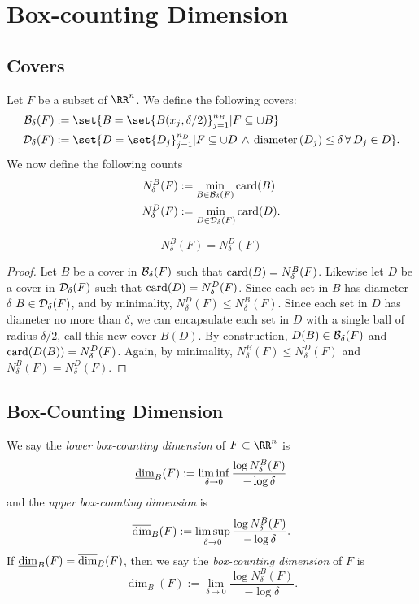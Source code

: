 
\chapter{Box-counting Dimension}

\section{Covers}

Let $F$ be a subset of $\RR^n$.
We define the following covers:
\begin{align*}
	\mcb_\delta(F)&:=\set{B=\set{B(x_j,\delta/2)}_{j=1}^{n_B}| F\subseteq \cup B}\\
	\mcd_\delta(F)&:=\set{D=\set{D_j}_{j=1}^{n_D}| F\subseteq \cup D \,\wedge\,\diam {(D_j)}\leq\delta\, \forall \, D_j\in D}.
\end{align*}
We now define the following counts
\begin{align*}
	N^B_\delta(F)&:=\min\limits_{B\in\mathcal{B}_\delta(F)}\operatorname{card}(B)\\
	N^D_\delta(F)&:=\min\limits_{D\in\mathcal{D}_\delta(F)}\operatorname{card}(D).
\end{align*}

\begin{thm}
	\[
		N^B_\delta(F)=N^D_\delta(F)
	\]
\end{thm}
\begin{proof}
	Let $B$ be a cover in $\mathcal{B}_\delta(F)$ such that $\operatorname{card}(B)=N^B_\delta(F)$.
	Likewise let $D$ be a cover in $\mathcal{D}_\delta(F)$ such that $\operatorname{card}(D)=N^D_\delta(F)$.
	Since each set in $B$ has diameter $\delta$ $B\in\mathcal{D}_\delta(F)$, and by minimality, $N^D_\delta(F)\leq N^B_\delta(F)$.
	Since each set in $D$ has diameter no more than $\delta$, we can encapsulate each set in $D$ with a single ball of radius $\delta/2$, call this new cover $B(D)$.
	By construction, $D(B)\in\mathcal{B}_\delta(F)$ and $\operatorname{card}(D(B))=N^D_\delta(F)$.
	Again, by minimality, $N^B_\delta(F)\leq N^D_\delta(F)$ and $N^B_\delta(F) = N^D_\delta(F)$.
\end{proof}

\section{Box-Counting Dimension}

\begin{definition}
	We say the \textit{lower box-counting dimension} of $F\subset\RR^n$ is
	\[
		\underline{\operatorname{dim}}_B(F):=\liminf\limits_{\delta\rightarrow 0} \frac{\log N^B_\delta(F)}{-\log\delta}
	\]
	and the \textit{upper box-counting dimension} is
	\[
		\overline{\operatorname{dim}}_B(F):=\limsup\limits_{\delta\rightarrow 0} \frac{\log N^B_\delta(F)}{-\log\delta}.
	\]
	If $\underline{\operatorname{dim}}_B(F)=\overline{\operatorname{dim}}_B(F)$, then we say the \textit{box-counting dimension} of $F$ is
	\[
		\dim_B(F):=\lim\limits_{\delta\rightarrow 0} \frac{\log N^B_\delta(F)}{-\log\delta}.
	\]
\end{definition}

